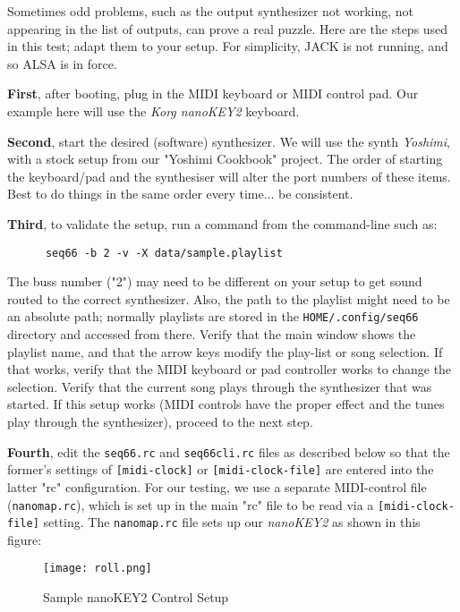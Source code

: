    Sometimes odd problems, such as the output synthesizer not working, not
   appearing in the list of outputs, can prove a real puzzle.
   Here are the steps used in this test; adapt them to your setup.  For
   simplicity, JACK is not running, and so ALSA is in force.

   \textbf{First}, after booting, plug in the MIDI keyboard or MIDI control
   pad.  Our example here will use the \textsl{Korg nanoKEY2} keyboard.  

   \textbf{Second}, start the desired (software) synthesizer.  We will use the
   synth \textsl{Yoshimi}, with a stock setup from our "Yoshimi Cookbook"
   project.  The order of starting the keyboard/pad and the synthesiser
   will alter the port numbers of these items.  Best to do things in the same
   order every time... be consistent.

   \textbf{Third}, to validate the setup, run a command from the command-line
   such as:

   \begin{verbatim}
      seq66 -b 2 -v -X data/sample.playlist
   \end{verbatim}

   The buss number ("2") may need to be different on your setup to get sound
   routed to the correct synthesizer.  Also, the path to the playlist might
   need to be an absolute path; normally playlists are stored in the
   \texttt{HOME/.config/seq66} directory and accessed from there.
   Verify that the main window shows the playlist name, and that the arrow keys
   modify the play-list or song selection.  If that works, verify that the MIDI
   keyboard or pad controller works to change the selection.
   Verify that the current song plays through the synthesizer that was started.
   If this setup works (MIDI controls have the proper effect and the tunes play
   through the synthesizer), proceed to the next step.

   \textbf{Fourth}, edit the \texttt{seq66.rc} and \texttt{seq66cli.rc}
   files as described below so that the former's settings of
   \texttt{[midi-clock]} or \texttt{[midi-clock-file]} are entered into the
   latter "rc" configuration.
   For our testing, we use a separate MIDI-control file 
   (\texttt{nanomap.rc}), which is set up
   in the main "rc" file to be read via a \texttt{[midi-clock-file]}
   setting.  The \texttt{nanomap.rc} file sets up our \textsl{nanoKEY2} as
   shown in this figure:

\begin{figure}[H]
   \centering 
   \texttt{[image: roll.png]}
   \caption{Sample nanoKEY2 Control Setup}
   \label{fig:headless_nanokey2_setup}
\end{figure}


